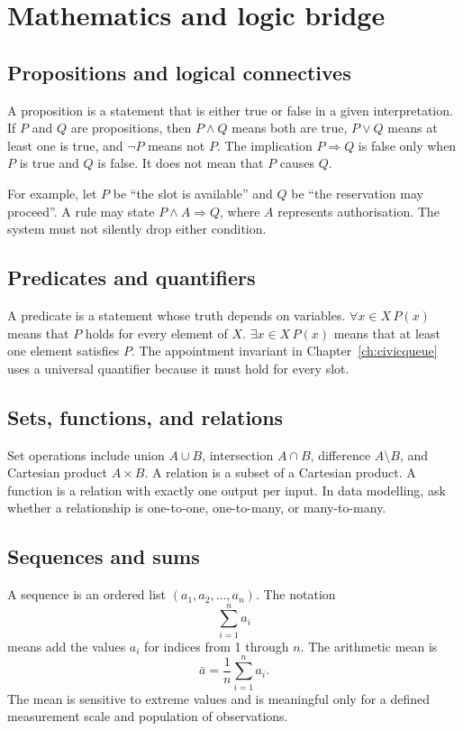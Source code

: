 \chapter{Mathematics and logic bridge}
\label{app:math}

\section{Propositions and logical connectives}
A proposition is a statement that is either true or false in a given interpretation. If $P$ and $Q$ are propositions, then $P\land Q$ means both are true, $P\lor Q$ means at least one is true, and $\neg P$ means not $P$. The implication $P\Rightarrow Q$ is false only when $P$ is true and $Q$ is false. It does not mean that $P$ causes $Q$.

For example, let $P$ be \enquote{the slot is available} and $Q$ be \enquote{the reservation may proceed}. A rule may state $P\land A\Rightarrow Q$, where $A$ represents authorisation. The system must not silently drop either condition.

\section{Predicates and quantifiers}
A predicate is a statement whose truth depends on variables. $\forall x\in X\,P(x)$ means that $P$ holds for every element of $X$. $\exists x\in X\,P(x)$ means that at least one element satisfies $P$. The appointment invariant in Chapter~\ref{ch:civicqueue} uses a universal quantifier because it must hold for every slot.

\section{Sets, functions, and relations}
Set operations include union $A\cup B$, intersection $A\cap B$, difference $A\setminus B$, and Cartesian product $A\times B$. A relation is a subset of a Cartesian product. A function is a relation with exactly one output per input. In data modelling, ask whether a relationship is one-to-one, one-to-many, or many-to-many.

\section{Sequences and sums}
A sequence is an ordered list $(a_1,a_2,\ldots,a_n)$. The notation
\[
\sum_{i=1}^{n}a_i
\]
means add the values $a_i$ for indices from 1 through $n$.
The arithmetic mean is
\[
\bar a=\frac{1}{n}\sum_{i=1}^{n}a_i.
\]
The mean is sensitive to extreme values and is meaningful only for a defined measurement scale and population of observations.

